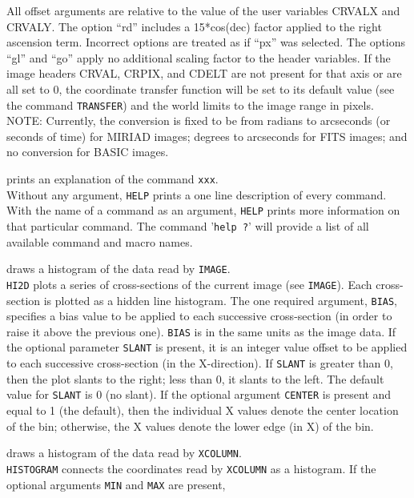 	All offset arguments are relative to the value of the user variables
	CRVALX and CRVALY.  The option ``rd'' includes a 15*cos(dec) factor
	applied to the right ascension term.  Incorrect options are treated
	as if ``px'' was selected.  The options ``gl'' and ``go'' apply no
	additional scaling factor to the header variables.  If the image
	headers CRVAL, CRPIX, and CDELT are not present for that axis or
	are all set to 0, the coordinate transfer function will be set to
	its default value (see the command
	{\tt TRANSFER}) and the world limits
	to the image range in pixels.
	NOTE: Currently, the conversion is
	fixed to be from radians to arcseconds (or seconds of time) for
	MIRIAD images; degrees to arcseconds for FITS images; and no
	conversion for BASIC images.
\item [{\tt HELP xxx } --] prints an explanation of the command {\tt xxx}.\\
	Without any argument, {\tt HELP} prints a one line
	description of every command.  With the name of a command as
	an argument, {\tt HELP} prints more information on that
	particular command.  The command '{\tt help ?}' will
	provide a list of all available command and macro names.
\item [{\tt HI2D bias [slant [center]] } --] draws a histogram of the data read by {\tt IMAGE}.\\
	{\tt HI2D} plots a series of cross-sections of the current
	image (see {\tt IMAGE}).  Each
	cross-section is plotted as a hidden line histogram.  The one
	required argument, {\tt BIAS}, specifies a bias value
	to be applied to each successive cross-section (in order to
	raise it above the previous one).  {\tt BIAS} is in the
	same units as the image data.  If the optional parameter
	{\tt SLANT} is present, it is an integer value offset to
	be applied to each successive cross-section (in the X-direction).
	If {\tt SLANT} is greater than 0, then the plot slants to
	the right; less than 0, it slants to the left.  The default value
	for {\tt SLANT} is 0 (no slant).  If the optional argument
	{\tt CENTER} is present and equal to 1 (the default), then
	the individual X values denote the center location of the bin;
	otherwise, the X values denote the lower edge (in X) of the bin.
\item [{\tt HISTOGRAM [MIN MAX [N]] } --] draws a histogram of the data read by {\tt XCOLUMN}.\\
	{\tt HISTOGRAM} connects the coordinates read by
	{\tt XCOLUMN} as a histogram.  If the
	optional arguments {\tt MIN} and {\tt MAX} are present,
